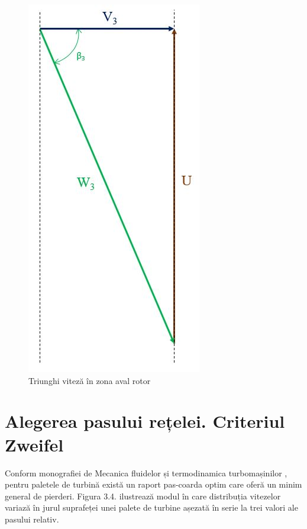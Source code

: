 \begin{figure}[h]
	\centering
	\includegraphics[scale=0.4]{figures/triunghi_viteza_ZAR.jpg}
	\caption{Triunghi viteză în zona aval rotor}
	\label{Triunghi viteză în zona aval rotor}
\end{figure}

\clearpage

\section{Alegerea pasului rețelei. Criteriul Zweifel}

Conform monografiei de Mecanica fluidelor și termodinamica turbomașinilor \cite{hall2013fluid}, pentru paletele de turbină există un raport pas-coarda optim care oferă un minim general de pierderi. Figura 3.4. ilustrează modul în care distribuția vitezelor variază în jurul suprafeței unei palete de turbine așezată în serie la trei valori ale pasului relativ.

